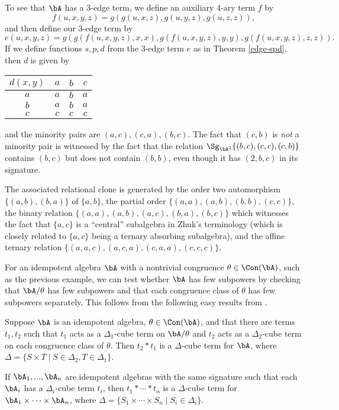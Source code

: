 \begin{ex}
To see that $\bA$ has a $3$-edge term, we define an auxiliary $4$-ary term $f$ by
\[
f(u,x,y,z) = g(g(u,x,z),g(u,y,z),g(u,z,z)),
\]
and then define our $3$-edge term by
\[
e(u,x,y,z) = g(g(f(u,x,y,z),x,x),g(f(u,x,y,z),y,y),g(f(u,x,y,z),z,z)).
\]
If we define functions $s,p,d$ from the $3$-edge term $e$ as in Theorem \ref{edge-spd}, then $d$ is given by
\begin{center}
\begin{tabular}{c|ccc}
$d(x,y)$ & $a$ & $b$ & $c$\\ \hline $a$ & $a$ & $b$ & $a$\\ $b$ & $a$ & $b$ & $a$\\ $c$ & $c$ & $c$ & $c$
\end{tabular}
\end{center}
and the minority pairs are $(a,c), (c,a), (b,c)$. The fact that $(c,b)$ is \emph{not} a minority pair is witnessed by the fact that the relation $\Sg_{\bA^2}\{(b,c),(c,c),(c,b)\}$ contains $(b,c)$ but does not contain $(b,b)$, even though it has $(2,b,c)$ in its signature.

The associated relational clone is generated by the order two automorphism $\{(a,b),(b,a)\}$ of $\{a,b\}$, the partial order $\{(a,a),(a,b),(b,b),(c,c)\}$, the binary relation $\{(a,a),(a,b),(a,c),(b,a),(b,c)\}$ which witnesses the fact that $\{a,c\}$ is a ``central'' subalgebra in Zhuk's terminology \cite{zhuk-dichotomy} (which is closely related to $\{a,c\}$ being a ternary absorbing subalgebra), and the affine ternary relation $\{(a,a,c),(a,c,a),(c,a,a),(c,c,c)\}$.
\end{ex}

For an idempotent algebra $\bA$ with a nontrivial congruence $\theta \in \Con(\bA)$, such as the previous example, we can test whether $\bA$ has few subpowers by checking that $\bA/\theta$ has few subpowers and that each congruence class of $\theta$ has few subpowers separately. This follows from the following easy results from \cite{cube-term-blockers}.

\begin{prop} Suppose $\bA$ is an idempotent algebra, $\theta \in \Con(\bA)$, and that there are terms $t_1,t_2$ such that $t_1$ acts as a $\Delta_1$-cube term on $\bA/\theta$ and $t_2$ acts as a $\Delta_2$-cube term on each congruence class of $\theta$. Then $t_2*t_1$ is a $\Delta$-cube term for $\bA$, where $\Delta = \{S\times T \mid S \in \Delta_2, T \in \Delta_1\}$.
\end{prop}

\begin{cor} If $\bA_1, ..., \bA_n$ are idempotent algebras with the same signature such that each $\bA_i$ has a $\Delta_i$-cube term $t_i$, then $t_1*\cdots*t_n$ is a $\Delta$-cube term for $\bA_1 \times \cdots \times \bA_n$, where $\Delta = \{S_1\times \cdots \times S_n \mid S_i \in \Delta_i\}$.
\end{cor}

